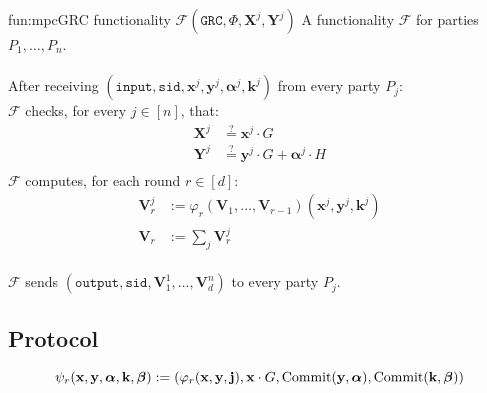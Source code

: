 \begin{afunctionality}{fun:mpc}{GRC functionality $\mathcal{F}(\texttt{GRC}, \Phi, \textbf{X}^j, \textbf{Y}^j)$}
A functionality $\mathcal{F}$ for parties $P_1, \ldots, P_n$.\\
\\
After receiving
$(\texttt{input}, \texttt{sid}, \textbf{x}^j, \textbf{y}^j, \boldsymbol{\alpha}^j, \textbf{k}^j)$ from every party $P_j$:\\
$\mathcal{F}$ checks, for every $j \in [n]$, that:
$$
\begin{aligned}
    \textbf{X}^j &\stackrel{?}{=} \textbf{x}^j \cdot G\\
    \textbf{Y}^j &\stackrel{?}{=} \textbf{y}^j \cdot G + \boldsymbol{\alpha}^j \cdot H\\
\end{aligned}
$$
$\mathcal{F}$ computes, for each round $r \in [d]$:
$$
\begin{aligned}
    \textbf{V}^j_{r} &:= \varphi_{r}(\textbf{V}_{1}, \ldots, \textbf{V}_{r - 1})(
        \textbf{x}^j, \textbf{y}^j, \textbf{k}^j
    )\\
    \textbf{V}_r &:= \sum_j \textbf{V}^j_r
\end{aligned}
$$\\
$\mathcal{F}$ sends $(\texttt{output}, \texttt{sid}, \textbf{V}^1_1, \ldots, \textbf{V}^n_d)$ to every party $P_j$.
\end{afunctionality}

\subsection{Protocol}

$$
\psi_r(\textbf{x}, \textbf{y}, \boldsymbol{\alpha}, \textbf{k}, \boldsymbol{\beta})
:= (\varphi_r(\textbf{x}, \textbf{y}, \textbf{j}), \textbf{x} \cdot G, \text{Commit}(\textbf{y}, \boldsymbol{\alpha}), \text{Commit}(\textbf{k}, \boldsymbol{\beta}))
$$

